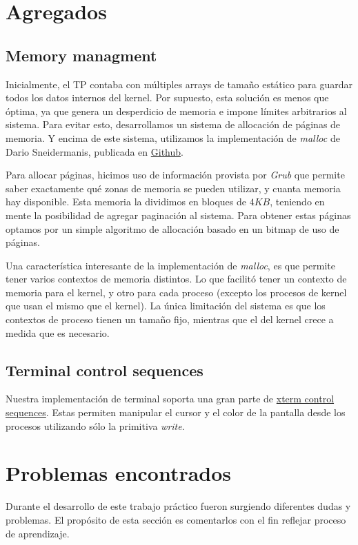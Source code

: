 \documentclass[a4paper,10pt]{article}
\begin{document}
\newpage
\section{Agregados}
\subsection{Memory managment}
Inicialmente, el TP contaba con múltiples arrays de tamaño estático para guardar todos los datos internos del kernel.
Por supuesto, esta solución es menos que óptima, ya que genera un desperdicio de memoria e impone límites arbitrarios al sistema.
Para evitar esto, desarrollamos un sistema de allocación de páginas de memoria.
Y encima de este sistema, utilizamos la implementación de \textit{malloc} de Dario Sneidermanis, publicada en \href{https://github.com/esneider/malloc}{Github}.

Para allocar páginas, hicimos uso de información provista por \textit{Grub} que permite saber exactamente qué zonas de memoria se pueden utilizar, 
y cuanta memoria hay disponible.
Esta memoria la dividimos en bloques de $4KB$, teniendo en mente la posibilidad de agregar paginación al sistema.
Para obtener estas páginas optamos por un simple algoritmo de allocación basado en un bitmap de uso de páginas.

Una característica interesante de la implementación de \textit{malloc}, es que permite tener varios contextos de memoria distintos.
Lo que facilitó tener un contexto de memoria para el kernel, y otro para cada proceso (excepto los procesos de kernel que usan el mismo que el kernel).
La única limitación del sistema es que los contextos de proceso tienen un tamaño fijo, mientras que el del kernel crece a medida que es necesario.

\subsection{Terminal control sequences}
Nuestra implementación de terminal soporta una gran parte de \href{http://invisible-island.net/xterm/ctlseqs/ctlseqs.html}{xterm control sequences}.
Estas permiten manipular el cursor y el color de la pantalla desde los procesos utilizando sólo la primitiva \textit{write}.

\newpage
\section{Problemas encontrados}

Durante el desarrollo de este trabajo práctico fueron surgiendo diferentes dudas y problemas. El propósito de esta
sección es comentarlos con el fin reflejar proceso de aprendizaje.
\end{document}

